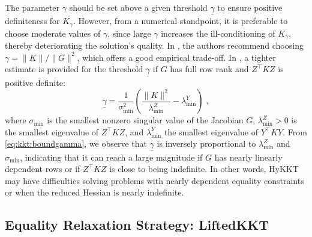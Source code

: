 \documentclass[smallextended]{svjour3}
\begin{document}
\begin{remark}
    The parameter $\gamma$ should be set above a given threshold $\underline{\gamma}$ to ensure positive definiteness for $K_\gamma$.
    However, from a numerical standpoint, it is preferable to choose moderate
    values of $\gamma$, since large $\gamma$ increases the ill-conditioning of $K_\gamma$, thereby deteriorating the solution's quality.
    In \cite{golub2003solving}, the authors recommend choosing $\gamma = \| K \| / \|G\|^2$, which offers a good empirical trade-off.
    In \cite[Lemma 2.10]{gould2010spectral}, a tighter estimate is provided
    for the threshold $\underline{\gamma}$ if $G$ has full row rank and $Z^\top K Z$ is positive definite:
    \begin{equation}
      \label{eq:kkt:boundgamma}
      \underline{\gamma} = \dfrac{1}{\sigma_{\min}^2} \left(
        \dfrac{\|K\|^2}{\lambda_{\min}^Z} - \lambda_{\min}^Y
      \right) \; ,
    \end{equation}
    where $\sigma_{\min}$ is the smallest nonzero singular value of the
    Jacobian $G$, $\lambda_{\min}^Z > 0$ is the smallest eigenvalue of
    $Z^\top K Z$, and $\lambda_{\min}^Y$ the smallest eigenvalue of $Y^\top K Y$.
    From \eqref{eq:kkt:boundgamma}, we observe that $\underline{\gamma}$ is
    inversely proportional to $\lambda_{\min}^Z$ and $\sigma_{\min}$,
    indicating that it can reach a large magnitude if $G$ has nearly linearly dependent
    rows or if $Z^\top K Z$ is close to being indefinite.
    In other words, HyKKT may have difficulties solving problems with
    nearly dependent equality constraints or when the reduced Hessian is nearly indefinite.
\end{remark}





\subsection{Equality Relaxation Strategy: LiftedKKT}
\label{sec:kkt:sckkt}
\end{document}
